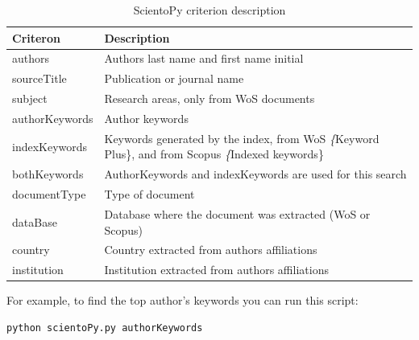 \documentclass[10pt,letterpaper]{article}
\begin{document}
\begin{table}[h]
	\centering
	\caption{ScientoPy criterion description}
	\label{table_criterion}
	
	
	\begin{tabular}{| p{3cm} |p{10cm}|}
		\hline
		\textbf{Criteron}       & \textbf{Description}                             \\
		\hline
		authors        & Authors last name and first name initial                                                                       \\
		\hline
		sourceTitle    & Publication or journal name                                                                                    \\
		\hline
		subject        & Research areas, only from WoS documents                                                                        \\
		\hline
		authorKeywords & Author keywords                                                                                                \\		
		\hline
		indexKeywords  & Keywords generated by the index, from WoS \textit\{Keyword Plus\}, and from Scopus \textit\{Indexed keywords\} \\
		\hline
		bothKeywords   & AuthorKeywords and indexKeywords are used for this search                                                      \\
		\hline
		documentType   & Type of document                                                                                               \\
		\hline
		dataBase       & Database where the document was extracted (WoS or Scopus)                                                      \\
		\hline
		country        & Country extracted from authors affiliations                                                                    \\
		\hline
		institution    & Institution extracted from authors affiliations                                                                \\
		\hline
	\end{tabular}
	
\end{table}

For example, to find the top author's keywords you can run this script: 

\begin{verbatim}
python scientoPy.py authorKeywords
\end{verbatim}
\end{document}
